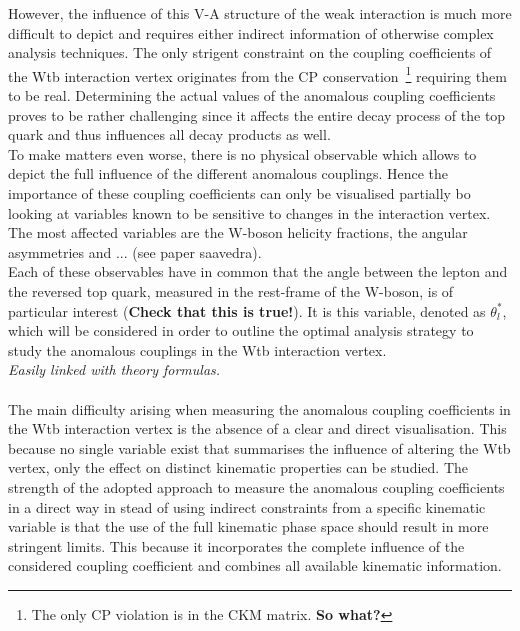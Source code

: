 However, the influence of this V-A structure of the weak interaction is much more difficult to depict and requires either indirect information of otherwise complex analysis techniques. The only strigent constraint on the coupling coefficients of the Wtb interaction vertex originates from the CP conservation~\footnote{The only CP violation is in the CKM matrix. \textbf{So what?}} requiring them to be real.
Determining the actual values of the anomalous coupling coefficients proves to be rather challenging since it affects the entire decay process of the top quark and thus influences all decay products as well.
\\
To make matters even worse, there is no physical observable which allows to depict the full influence of the different anomalous couplings. Hence the importance of these coupling coefficients can only be visualised partially bo looking at variables known to be sensitive to changes in the interaction vertex. The most affected variables are the W-boson helicity fractions, the angular asymmetries and ... (see paper saavedra).
\\
Each of these observables have in common that the angle between the lepton and the reversed top quark, measured in the rest-frame of the W-boson, is of particular interest (\textbf{Check that this is true!}). It is this variable, denoted as $\theta_{l}^{*}$, which will be considered in order to outline the optimal analysis strategy to study the anomalous couplings in the Wtb interaction vertex.
\\
\textit{Easily linked with theory formulas.}
\\
\hline \hfill \\
The main difficulty arising when measuring the anomalous coupling coefficients in the Wtb interaction vertex is the absence of a clear and direct visualisation.
This because no single variable exist that summarises the influence of altering the Wtb vertex, only the effect on distinct kinematic properties can be studied. %
The strength of the adopted approach to measure the anomalous coupling coefficients in a direct way in stead of using indirect constraints from a specific kinematic variable is that the use of the full kinematic phase space should result in more stringent limits.
This because it incorporates the complete influence of the considered coupling coefficient and combines all available kinematic information. 
